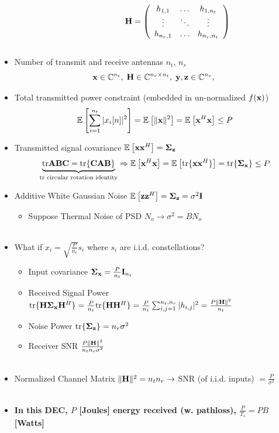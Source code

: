 \documentclass[xcolor=dvipsnames,aspectratio=169]{beamer}
\begin{document}
{\begin{columns}
\begin{column}{6cm}
    \begin{figure}
    
    \end{figure}
\end{column}
\begin{column}{6cm}
    $\mathbf{H}=\left(\begin{array}{cccc}
 h_{1,1}&\dots&h_{1,n_t}\\
 \vdots&\ddots&\vdots\\
 h_{n_r,1}&\dots&h_{n_r,n_t}\\
\end{array}\right)
$
\end{column}
\end{columns}
 \begin{itemize}
 \item Number of transmit and receive antennas $n_t$, $n_r$
 $$\mathbf{x}\in \mathbb{C}^{n_t},\;\mathbf{H}\in \mathbb{C}^{n_r\times n_t},\;\mathbf{y},\mathbf{z}\in \mathbb{C}^{n_r},\;$$
 \item Total transmitted power constraint (embedded in un-normalized $f(\mathbf{x})$)
 $${\mathbb{E}_{}\left[\sum_{i=1}^{n_t}|x_i[n]|^2\right]}={\mathbb{E}_{}\left[\|\mathbf{x}\|^2\right]}={\mathbb{E}_{}\left[\mathbf{x}^H\mathbf{x}\right]}\leq P$$
 \item Transmitted signal covariance ${\mathbb{E}_{}\left[\mathbf{x}\mathbf{x}^H\right]}=\mathbf{\boldsymbol{\Sigma}}_{\mathbf{z}}$
 $$\underset{\textnormal{tr circular rotation identity}}{\underbrace{\textnormal{tr}{\mathbf{A}\mathbf{B}\mathbf{C}}=\textnormal{tr}\{\mathbf{C}\mathbf{A}\mathbf{B}\}}}\Rightarrow {\mathbb{E}_{}\left[\mathbf{x}^H\mathbf{x}\right]}={\mathbb{E}_{}\left[\textnormal{tr}\{\mathbf{x}\mathbf{x}^H\}\right]}=\textnormal{tr}\{\mathbf{\boldsymbol{\Sigma}}_{\mathbf{x}}\}\leq P$$
 \pagebreak
 \item Additive White Gaussian Noise ${\mathbb{E}_{}\left[\mathbf{z}\mathbf{z}^H\right]}=\mathbf{\boldsymbol{\Sigma}}_{\mathbf{z}}=\sigma^2\mathbf{I}$
 \begin{itemize}
    \item Suppose Thermal Noise of PSD $N_o\to\sigma^2=BN_o$\\ \ \\
 \end{itemize} 
 \item What if $x_i=\sqrt{\frac{P}{n_t}}s_i$ where $s_i$ are i.i.d. constellations?
 \begin{itemize}
    \item Input covariance $\mathbf{\boldsymbol{\Sigma}}_{\mathbf{x}}=\frac{P}{n_t}\mathbf{I}_{n_t}$
    \item Received Signal Power $\textnormal{tr}\{\mathbf{H}\mathbf{\boldsymbol{\Sigma}}_{\mathbf{x}}\mathbf{H}^H\}=\frac{P}{n_t}\textnormal{tr}\{\mathbf{H}\mathbf{H}^H\}=\frac{P}{n_t}\sum_{i,j=1}^{n_t,n_r} |h_{i,j}|^2=\frac{P\|\mathbf{H}\|^2}{n_t}$
    \item Noise Power $\textnormal{tr}\{\mathbf{\boldsymbol{\Sigma}}_{\mathbf{z}}\}=n_r\sigma^2$
    \item Receiver SNR $\frac{P\|\mathbf{H}\|^2}{n_tn_r \sigma^2}$\\ \ \\
 \end{itemize} 
 \item Normalized Channel Matrix $\|\mathbf{H}\|^2=n_tn_r\to$ SNR (of i.i.d. inputs) $=\frac{P}{\sigma^2}$ \\ \ \\
 \item \textbf{In this DEC, $P$ [Joules] energy received (w. pathloss), $\frac{P}{T_s}=PB$ [Watts]}
\end{itemize}
}
\end{document}
